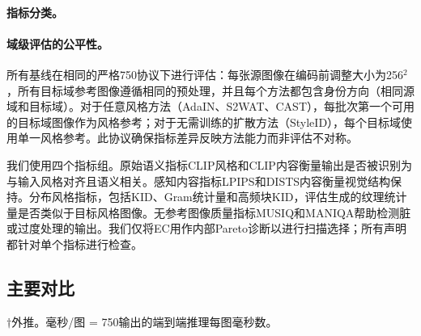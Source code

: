 \documentclass[letterpaper]{article}
\begin{document}
\paragraph{指标分类。}
\paragraph{域级评估的公平性。}
所有基线在相同的严格750协议下进行评估：每张源图像在编码前调整大小为256$^2$，所有目标域参考图像遵循相同的预处理，并且每个方法都包含身份方向（相同源域和目标域）。对于任意风格方法（AdaIN、S2WAT、CAST），每批次第一个可用的目标域图像作为风格参考；对于无需训练的扩散方法（StyleID），每个目标域使用单一风格参考。此协议确保指标差异反映方法能力而非评估不对称。

我们使用四个指标组。原始语义指标CLIP风格和CLIP内容衡量输出是否被识别为与输入风格对齐且语义相关。感知内容指标LPIPS和DISTS内容衡量视觉结构保持。分布风格指标，包括KID、Gram统计量和高频块KID，评估生成的纹理统计量是否类似于目标风格图像。无参考图像质量指标MUSIQ和MANIQA帮助检测脏或过度处理的输出。我们仅将EC用作内部Pareto诊断以进行扫描选择；所有声明都针对单个指标进行检查。

\subsection{主要对比}
\begin{table}[t]
\centering
\caption{严格750对比与效率。$\uparrow$ = 越高越好，$\downarrow$ = 越低越好。750张图像的端到端推理时间。标记$\dagger$的训练时间为外推估计。}
\label{tab:main}
\small
\setlength{\tabcolsep}{5pt}
\smallskip
\footnoterule\small
$\dagger$外推。毫秒/图 = 750输出的端到端推理每图毫秒数。
\end{table}
\end{document}
